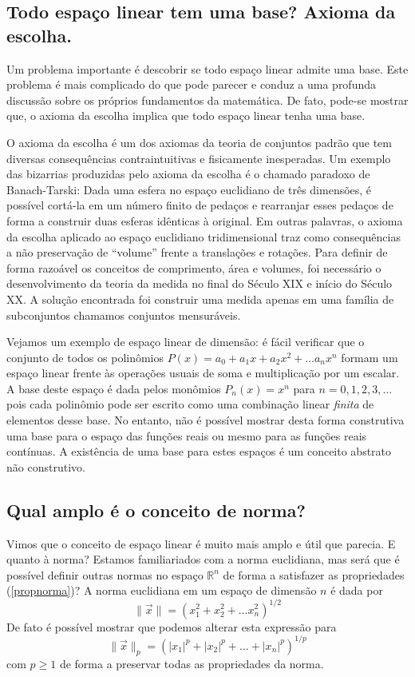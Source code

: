 \subsection{Todo espaço linear tem uma base? Axioma da escolha.}
Um problema importante é descobrir se todo espaço linear admite uma base. Este problema é mais complicado do que pode parecer e conduz a uma profunda discussão sobre os próprios fundamentos da matemática. De fato, pode-se mostrar que, o axioma da escolha implica que todo espaço linear tenha uma base.

O axioma da escolha é um dos axiomas da teoria de conjuntos padrão que tem diversas consequências contraintuitivas e fisicamente inesperadas. Um exemplo das bizarrias produzidas pelo axioma da escolha é o chamado paradoxo de Banach-Tarski: Dada uma esfera no espaço euclidiano de três dimensões, é possível cortá-la em um número finito de pedaços e rearranjar esses pedaços de forma a construir duas esferas idênticas à original. Em outras palavras, o axioma da escolha aplicado ao espaço euclidiano tridimensional traz como consequências a não preservação de ``volume'' frente a translações e rotações. Para definir de forma razoável os conceitos de comprimento, área e volumes, foi necessário o desenvolvimento da teoria da medida no final do Século XIX e início do Século XX. A solução encontrada foi construir uma medida apenas em uma família de subconjuntos chamamos conjuntos mensuráveis.

Vejamos um exemplo de espaço linear de dimensão: é fácil verificar que o conjunto de todos os polinômios $P(x)=a_0+a_1x+a_2x^2+\ldots a_nx^n$ formam um espaço linear frente às operações usuais de soma e multiplicação por um escalar. A base deste espaço é dada pelos monômios $P_{n}(x)=x^n$ para $n=0,1,2,3,\ldots$ pois cada polinômio pode ser escrito como uma combinação linear \emph{finita} de elementos desse base. No entanto, não é possível mostrar desta forma construtiva uma base para o espaço das funções reais ou mesmo para as funções reais contínuas. A existência de uma base para estes espaços é um conceito abstrato não construtivo.

\subsection{Qual amplo é o conceito de norma?}
Vimos que o conceito de espaço linear é muito mais amplo e útil que parecia. E quanto à norma? Estamos familiariados com a norma euclidiana, mas será que é possível definir outras normas no espaço $\mathbb{R}^n$ de forma a satisfazer as propriedades (\ref{propnorma})? A norma euclidiana em um espaço de dimensão $n$ é dada por
$$\|\vec{x}\|=\left(x_1^2+x_2^2+\ldots x_n^2\right)^{1/2}$$
De fato é possível mostrar que podemos alterar esta expressão para
$$\|\vec{x}\|_p=\left(|x_1|^p+|x_2|^p+\ldots +|x_n|^p\right)^{1/p}$$
com $p\geq 1$ de forma a preservar todas as propriedades da norma.

